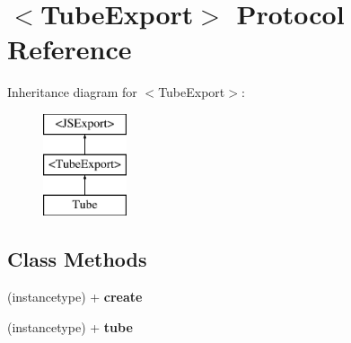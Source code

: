 \hypertarget{protocol_tube_export-p}{}\section{$<$Tube\+Export$>$ Protocol Reference}
\label{protocol_tube_export-p}
Inheritance diagram for $<$Tube\+Export$>$\+:\begin{figure}[H]
\begin{center}
\leavevmode
\includegraphics[height=3.000000cm]{protocol_tube_export-p}
\end{center}
\end{figure}
\subsection*{Class Methods}
\begin{DoxyCompactItemize}
\item 
\hypertarget{protocol_tube_export-p_aa2fea73272cd353742f57dfe0d0790ca}{}(instancetype) + {\bfseries create}\label{protocol_tube_export-p_aa2fea73272cd353742f57dfe0d0790ca}

\item 
\hypertarget{protocol_tube_export-p_abb53776d5c6d9d0fac725409d4c79e72}{}(instancetype) + {\bfseries tube}\label{protocol_tube_export-p_abb53776d5c6d9d0fac725409d4c79e72}

\end{DoxyCompactItemize}
